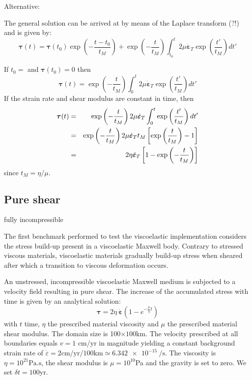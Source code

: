 \vspace{1cm}
Alternative:

The general solution can be arrived at  
by means of the Laplace transform (?!) and is given by: 
\[
{\bm \tau}(t) = {\bm \tau}(t_0) \exp\left( -\frac{t-t_0}{t_M} \right) + \exp \left(-\frac{t}{t_M}\right)
\int_{t_0}^{t} 2 \mu \dot{\bm \varepsilon}_T  \exp \left(\frac{t'}{t_M}\right) dt'
\]

If $t_0=$ and ${\bm \tau}(t_0)=0$ then
\[
{\bm \tau}(t) =  \exp \left(-\frac{t}{t_M}\right)
\int_{0}^{t} 2 \mu \dot{\bm \varepsilon}_T  \exp \left( \frac{t'}{t_M} \right) dt'
\]
If the strain rate and shear modulus are constant in time, then 
\begin{eqnarray}
{\bm \tau}(t) 
&=&  \exp \left(-\frac{t}{t_M}\right)
2 \mu \dot{\bm \varepsilon}_T   \int_{0}^{t} \exp \left( \frac{t'}{t_M} \right) dt' \nonumber\\
&=&  \exp \left(-\frac{t}{t_M}\right)
2 \mu \dot{\bm \varepsilon}_T  t_M  \left[ \exp \left( \frac{t}{t_M} \right) -1  \right] \nonumber\\
&=& 
2 \eta \dot{\bm \varepsilon}_T   \left[ 1 - \exp \left( -\frac{t}{t_M} \right)\right] \nonumber
\end{eqnarray}
since $t_M=\eta/\mu$.






















\subsection{Pure shear}


{\color{orange} fully incompressible}

The first benchmark performed to test the viscoelastic implementation considers the stress
build-up present in a viscoelastic Maxwell body. Contrary to stressed viscous materials,
viscoelastic materials gradually build-up stress when sheared after which a transition to viscous deformation occurs.

An unstressed, incompressible viscoelastic Maxwell medium is subjected to a velocity field
resulting in pure shear.
The increase of the accumulated stress with time is given by an analytical solution:
\begin{equation}
{\bm \tau} = 2\eta\ {\dot{\bm \varepsilon}} \left ( 1-e^{-\frac{\mu }{\eta} t } \right )
\end{equation}
with $t$ time, $\eta$ the prescribed material viscosity and $\mu$ the prescribed material shear modulus.
The domain size is 100$\times 100$km.
The velocity prescribed at all boundaries equals $v=1$ cm/yr in magnitude yielding a constant
background strain rate of $\dot{\varepsilon}=2\text{cm/yr}/100\text{km}\simeq \SI{6.342e-15}{\per\second}$.
The viscosity is $\eta= 10^{21}\text{Pa.s}$, the shear modulus is
$\mu =10^{10}$Pa and the gravity is set to zero. We set $\delta t=100$yr.

